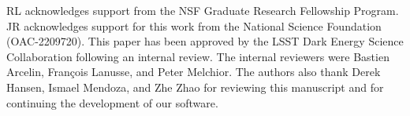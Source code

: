 RL acknowledges support from the NSF Graduate Research Fellowship Program.
JR acknowledges support for this work from the National Science Foundation (OAC-2209720).
This paper has been approved by the LSST Dark Energy Science Collaboration following an internal review. 
The internal reviewers were Bastien Arcelin, Fran\c{c}ois Lanusse, and Peter Melchior. 
The authors also thank Derek Hansen, Ismael Mendoza, and Zhe Zhao for reviewing this manuscript and for continuing the development of our software.